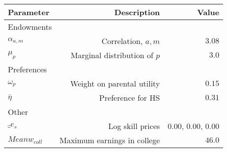 \begin{tabular}{lrr}
\hline
Parameter & Description  & Value  \\
\hline
Endowments &   &   \\
$\alpha_{a,m}$ & Correlation, $a,m$  & $3.08$  \\
$\mu_{p}$ & Marginal distribution of $p$  & $3.0$  \\
Preferences &   &   \\
$\omega_{p}$ & Weight on parental utility  & $0.15$  \\
$\bar{\eta}$ & Preference for HS  & $0.31$  \\
Other &   &   \\
$\hat_{e}_{s}$ & Log skill prices  & 0.00, 0.00, 0.00  \\
$Mean w_{coll}$ & Maximum earnings in college  & $46.0$  \\
\hline
\end{tabular}%
